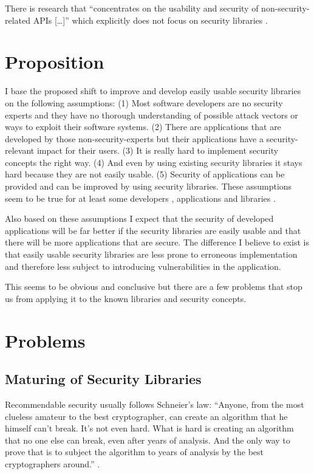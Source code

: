 \documentclass{sig-alternate-05-2015}
\begin{document}
There is research that \enquote{concentrates on the usability and security of non-security-related APIs [\dots]} \cite{Myers:2016:IAU:2896587} which explicitly does not focus on security libraries \cite{Weber:2016:EEOAUAS}. 

\section{Proposition}
I base the proposed shift to improve and develop easily usable security libraries on the following assumptions: (1) Most software developers are no security experts and they have no thorough understanding of possible attack vectors or ways to exploit their software systems. (2) There are applications that are developed by those non-security-experts but their applications have a security-relevant impact for their users. (3) It is really hard to implement security concepts the right way. (4) And even by using existing security libraries it stays hard because they are not easily usable. (5) Security of applications can be provided and can be improved by using security libraries.
These assumptions seem to be true for at least some developers \cite{Fahl:2013:RSD:2508859.2516655}, applications and libraries \cite{Georgiev:2012:MDC:2382196.2382204}.

Also based on these assumptions I expect that the security of developed applications will be far better if the security libraries are easily usable and that there will be more applications that are secure.
The difference I believe to exist is that easily usable security libraries are less prone to erroneous implementation and therefore less subject to introducing vulnerabilities in the application.

This seems to be obvious and conclusive but there are a few problems that stop us from applying it to the known libraries and security concepts.

\section{Problems}

\subsection{Maturing of Security Libraries}
Recommendable security usually follows Schneier's law: \enquote{Anyone, from the most clueless amateur to the best cryptographer, can create an algorithm that he himself can't break. It's not even hard. What is hard is creating an algorithm that no one else can break, even after years of analysis. And the only way to prove that is to subject the algorithm to years of analysis by the best cryptographers around.} \cite{Schneier:2000:SCB:341000.341009}.
\end{document}
